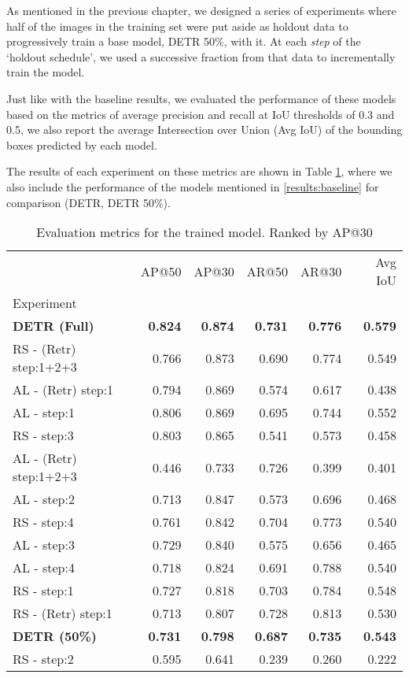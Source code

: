 \documentclass[../main.tex]{subfiles}
\begin{document}
As mentioned in the previous chapter, we designed a series of experiments where half of the images in the training set were put aside as holdout data to progressively train a base model, DETR 50\%, with it. At each \textit{step} of the `holdout schedule', we used a successive fraction from that data to incrementally train the model.

Just like with the baseline results, we evaluated the performance of these models based on the metrics of average precision and recall at IoU thresholds of 0.3 and 0.5, we also report the average Intersection over Union (Avg IoU) of the bounding boxes predicted by each model.

The results of each experiment on these metrics are shown in Table \ref{tab:eval_metrics}, where we also include the performance of the models mentioned in \ref{results:baseline} for comparison (DETR, DETR 50\%).

\begin{table}[h!]
    \centering
    \caption{Evaluation metrics for the trained model. Ranked by AP@30}
    \label{tab:eval_metrics}
    \begin{tabular}{lrrrrr}
    \toprule
    {} &  AP@50 &  AP@30 &  AR@50 &  AR@30 &  Avg IoU \\
    Experiment         &        &        &        &        &          \\
    \midrule
    \textbf{DETR (Full)} & \textbf{0.824} & \textbf{0.874} & \textbf{0.731} & \textbf{0.776} & \textbf{0.579} \\
    RS - (Retr) step:1+2+3   &  0.766 &  0.873 &  0.690 &  0.774 &    0.549 \\
    AL - (Retr) step:1 &  0.794 &  0.869 &  0.574 &  0.617 &    0.438 \\
    AL - step:1        &  0.806 &  0.869 &  0.695 &  0.744 &    0.552 \\
    RS - step:3        &  0.803 &  0.865 &  0.541 &  0.573 &    0.458 \\
    AL - (Retr) step:1+2+3 &  0.446 &  0.733 &  0.726 &  0.399 &    0.401 \\
    AL - step:2        &  0.713 &  0.847 &  0.573 &  0.696 &    0.468 \\
    RS - step:4 &  0.761 &  0.842 &  0.704 &  0.773 &    0.540 \\
    AL - step:3        &  0.729 &  0.840 &  0.575 &  0.656 &    0.465 \\
    AL - step:4        &  0.718 &  0.824 &  0.691 &  0.788 &    0.540 \\
    RS - step:1        &  0.727 &  0.818 &  0.703 &  0.784 &    0.548 \\
    RS - (Retr) step:1 &  0.713 &  0.807 &  0.728 &  0.813 &    0.530 \\
    \textbf{DETR (50\%)} & \textbf{0.731 }&	\textbf{0.798 }& \textbf{0.687} &	\textbf{0.735} &	\textbf{0.543} \\
    RS - step:2        &  0.595 &  0.641 &  0.239 &  0.260 &    0.222 \\
    \bottomrule
    \end{tabular}
    \end{table}
\end{document}
